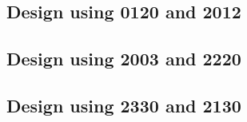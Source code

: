 
 \begin{center}




 \end{center}



\subsection{Design using 0120 and 2012}


 \begin{center}




 \end{center}



\subsection{Design using 2003 and 2220}


 \begin{center}




 \end{center}



\subsection{Design using 2330 and 2130}


